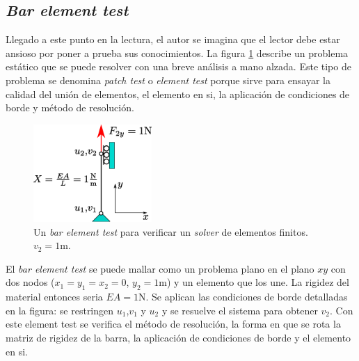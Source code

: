 \documentclass[11pt, a4paper,titlepage]{article}
\begin{document}
\subsection*{\textit{Bar element test}}
Llegado a este punto en la lectura, el autor se imagina que el lector debe estar ansioso por poner a prueba sus conocimientos. La figura \ref{fig:barpatch} describe un problema estático que se puede resolver con una breve análisis a mano alzada. Este tipo de problema se denomina \textit{patch test} o \textit{element test} porque sirve para ensayar la calidad del unión de elementos, el elemento en si, la aplicación de condiciones de borde y método de resolución. 
\begin{figure}[htb!]
	\centering
	\includegraphics[width=0.4\textwidth]{fig/barpatch.eps}
	\caption{Un \textit{bar element test} para verificar un \textit{solver} de elementos finitos. $v_2=1$m.}
	\label{fig:barpatch}
\end{figure}

El \textit{bar element test} se puede mallar como un problema plano en el plano $xy$ con dos nodos ($x_1=y_1=x_2=0$, $y_2=1$m) y un elemento que los une. La rigidez del material entonces seria $EA=1$N. Se aplican las condiciones de borde detalladas en la figura: se restringen $u_1$,$v_1$ y $u_2$ y se resuelve el sistema para obtener $v_2$. Con este element test se verifica el método de resolución, la forma en que se rota la matriz de rigidez de la barra, la aplicación de condiciones de borde y el elemento en si. 
\end{document}
